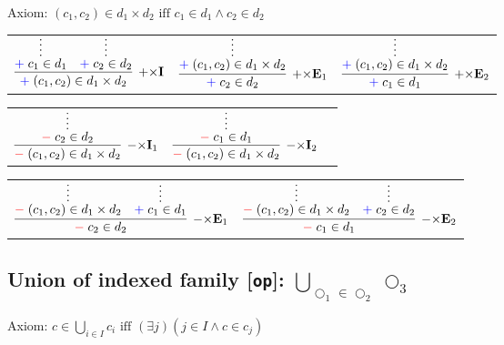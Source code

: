 \documentclass[11pt]{article}
\begin{document}
\smallskip
\noindent
Axiom: $(c_1,c_2)\in d_1\times d_2\text{ iff }
c_1\in d_1 \land c_2 \in d_2 $
\smallskip

\noindent
\begin{tabular}{ccc}
$
\infer[\AssertRule{\times}\Intro{}]{\Assert{\Tuple{c_1,c_2}\in d_1\times d_2}}{
	\infer*{\Assert{c_1\in d_1}}{}
	&
	\infer*{\Assert{c_2\in d_2}}{}
}
$
\hspace{1cm}
&
$
\infer[\AssertRule{\times}\Elim{1}]{\Assert{c_2\in d_2}}{
	\infer*{\Assert{\Tuple{c_1,c_2}\in d_1\times d_2}}{}
}
$
\hspace{1cm}
&
$
\infer[\AssertRule{\times}\Elim{2}]{\Assert{c_1\in d_1}}{
	\infer*{\Assert{\Tuple{c_1,c_2}\in d_1\times d_2}}{}
}
$
\end{tabular}
\bigskip

\noindent
\begin{tabular}{ccc}
$
\infer[\DenyRule{\times}\Intro{1}]{\Deny{\Tuple{c_1,c_2}\in d_1\times d_2}}{
	\infer*{\Deny{c_2\in d_2}}{}
}
$
\hspace{.2cm}
&
$
\infer[\DenyRule{\times}\Intro{2}]{\Deny{\Tuple{c_1,c_2}\in d_1\times d_2}}{
	\infer*{\Deny{c_1\in d_1}}{}
}
$
\hspace{.2cm}
\end{tabular}
\bigskip

\noindent
\begin{tabular}{cc}
$
\infer[\DenyRule{\times}\Elim{1}]{\Deny{c_2\in d_2}}{
	\infer*{\Deny{\Tuple{c_1,c_2}\in d_1\times d_2}}{}
	&
	\infer*{\Assert{c_1\in d_1}}{}
}
$
\hspace{1cm}
&
$
\infer[\DenyRule{\times}\Elim{2}]{\Deny{c_1\in d_1}}{
	\infer*{\Deny{\Tuple{c_1,c_2}\in d_1\times d_2}}{}
	&
	\infer*{\Assert{c_2\in d_2}}{}
}
$
\end{tabular}
\bigskip


\newpage


\subsection*{Union of indexed family [\texttt{op}]: $\bigcup\limits_{\bigcirc_1\in \bigcirc_2}\bigcirc_3$}

\smallskip
\noindent
Axiom: $c \in \bigcup\limits_{i\in I}c_i\text{ iff }
(\exists j) (j\in I \land c\in c_j)$
\smallskip
\end{document}
